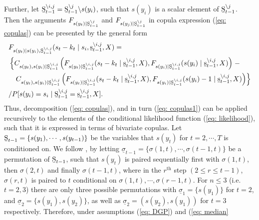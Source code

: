 \documentclass[harvard,11pt]{article}
\begin{document}
\endgroup
Further, let $\text{\b{S}}_{t-1}^{\backslash i,j}=\text{\b{S}}_{t-1}^{\backslash j}\backslash s(y_ i)$, such that $s(y_ i)$ is a scalar element of $\text{\b{S}}_{t-1}^{\backslash j}$. Then the arguments $F_{s(y_t)\mid\text{\b{S}}_{t-1}^{\backslash j}}$ and $F_{s(y_j)\mid\text{\b{S}}_{t-1}^{\backslash j}}$ in copula expression (\ref{eq: copulas}) can be presented by the general form
\begingroup
\allowdisplaybreaks
\begin{align}\label{eq: copulas1}
\begin{split}
&F_{s(y_t)\mid s(y_{i}),\text{\b{S}}_{t-1}^{\backslash i,j}}(s_t-k_t\mid s_{i},\text{\b{s}}_{t-1}^{\backslash i,j},X)=\\
&\left\{C_{s(y_t),s(y_ i)\mid \text{\b{S}}_{t-1}^{\backslash i,j}}\left(F_{s(y_t)\mid \text{\b{S}}_{t-1}^{\backslash i,j}}(s_t-k_t\mid \text{\b{s}}_{t-1}^{\backslash i,j},X),F_{s(y_ i)\mid \text{\b{S}}_{t-1}^{\backslash i,j}}(s(y_ i)\mid \text{\b{s}}_{t-1}^{\backslash i,j},X)\right)\right.-\\
&\textcolor{white}{=}\left.C_{s(y_t),s(y_ i)\mid \text{\b{S}}_{t-1}^{\backslash i,j}}\left(F_{s(y_t)\mid \text{\b{S}}_{t-1}^{\backslash i,j}}(s_t-k_t\mid \text{\b{s}}_{t-1}^{\backslash i,j},X),F_{s(y_ i)\mid \text{\b{S}}_{t-1}^{\backslash i,j}}(s(y_ i)-1\mid \text{\b{s}}_{t-1}^{\backslash i,j},X)\right)\right\}\\
&/P[s(y_ i)=s_ i\mid \text{\b{S}}_{t-1}^{\backslash i,j}=\text{\b{s}}_{t-1}^{\backslash i,j},X].
\end{split}
\end{align}
\endgroup
Thus, decomposition (\ref{eq: copulas}), and in turn (\ref{eq: copulas1}) can be applied recursively to the elements of the conditional likelihood function (\ref{eq: likelihood}), such that it is expressed in terms of bivariate copulas. Let $\text{\b{S}}_{t-1}=\{s(y_1),\cdots,s(y_{t-1})\}$ be the variables that $s(y_t)$ for $t=2,\cdots,T$ is conditioned on. We follow \citet{joe2014dependence}, by letting $\underline{\sigma}_{t-1}=\{\sigma(1,t),\cdots,\sigma(t-1,t)\}$ be a permutation of $\text{\b{S}}_{t-1}$, such that $s(y_t)$ is paired sequentially first with $\sigma(1,t)$, then $\sigma(2,t)$ and finally $\sigma(t-1,t)$, where in the $r^{\text{th}}$ step $(2\leq r\leq t-1)$, $\sigma(r,t)$ is paired to $t$ conditional on $\sigma(1,t),\cdots,\sigma(r-1,t)$. For $n\leq3$ (i.e. $t=2,3$) there are only three possible permutations with $\underline{\sigma}_1=\{s(y_1)\}$ for $t=2$, and $\underline{\sigma}_2=\{s(y_1),s(y_2)\}$, as well as $\underline{\sigma}_2=(s(y_2),s(y_1))$ for $t=3$ respectively. Therefore, under assumptions (\ref{eq: DGP}) and (\ref{eq: median}%
\end{document}
